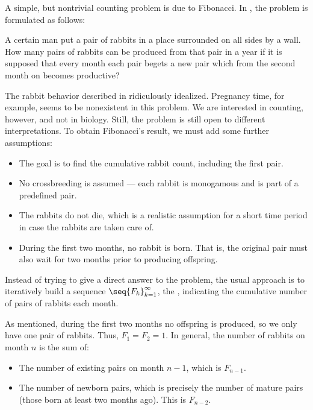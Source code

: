 \begin{example}\label{ex:fibonacci_rabbits}
  A simple, but nontrivial counting problem is due to Fibonacci. In \cite{MacTutor:fibonacci}, the problem is formulated as follows:
  \begin{displayquote}
    A certain man put a pair of rabbits in a place surrounded on all sides by a wall. How many pairs of rabbits can be produced from that pair in a year if it is supposed that every month each pair begets a new pair which from the second month on becomes productive?
  \end{displayquote}

  The rabbit behavior described in ridiculously idealized. Pregnancy time, for example, seems to be nonexistent in this problem. We are interested in counting, however, and not in biology. Still, the problem is still open to different interpretations. To obtain Fibonacci's result, we must add some further assumptions:
  \begin{itemize}
    \item The goal is to find the cumulative rabbit count, including the first pair.
    \item No crossbreeding is assumed --- each rabbit is monogamous and is part of a predefined pair.
    \item The rabbits do not die, which is a realistic assumption for a short time period in case the rabbits are taken care of.
    \item During the first two months, no rabbit is born. That is, the original pair must also wait for two months prior to producing offspring.
  \end{itemize}

  Instead of trying to give a direct answer to the problem, the usual approach is to iteratively build a sequence \( \seq{ F_k }_{k=1}^\infty \), the , indicating the cumulative number of pairs of rabbits each month.

  As mentioned, during the first two months no offspring is produced, so we only have one pair of rabbits. Thus, \( F_1 = F_2 = 1 \). In general, the number of rabbits on month \( n \) is the sum of:
  \begin{itemize}
    \item The number of existing pairs on month \( n - 1 \), which is \( F_{n - 1} \).
    \item The number of newborn pairs, which is precisely the number of mature pairs (those born at least two months ago). This is \( F_{n - 2} \).
  \end{itemize}


\end{example}
